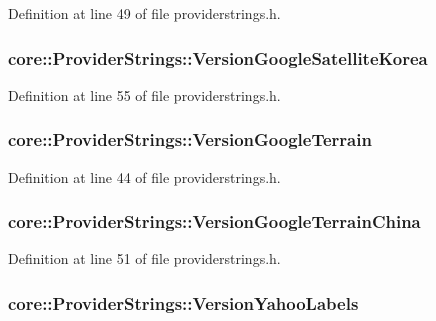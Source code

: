 \-Definition at line 49 of file providerstrings.\-h.

\hypertarget{group___o_p_map_widget_ga33344ab29672c4dcedd40642df473969}{
\subsubsection[{\-Version\-Google\-Satellite\-Korea}]{ {\bf core\-::\-Provider\-Strings\-::\-Version\-Google\-Satellite\-Korea}}}\label{group___o_p_map_widget_ga33344ab29672c4dcedd40642df473969}


\-Definition at line 55 of file providerstrings.\-h.

\hypertarget{group___o_p_map_widget_gacab9db5e4f5aff7ca4ea6bc63e1ca876}{
\subsubsection[{\-Version\-Google\-Terrain}]{ {\bf core\-::\-Provider\-Strings\-::\-Version\-Google\-Terrain}}}\label{group___o_p_map_widget_gacab9db5e4f5aff7ca4ea6bc63e1ca876}


\-Definition at line 44 of file providerstrings.\-h.

\hypertarget{group___o_p_map_widget_gad75c975b2a7aeefd01f65c78e701394b}{
\subsubsection[{\-Version\-Google\-Terrain\-China}]{ {\bf core\-::\-Provider\-Strings\-::\-Version\-Google\-Terrain\-China}}}\label{group___o_p_map_widget_gad75c975b2a7aeefd01f65c78e701394b}


\-Definition at line 51 of file providerstrings.\-h.

\hypertarget{group___o_p_map_widget_gae16013eddeb9d3b70af56f0e03eeab19}{
\subsubsection[{\-Version\-Yahoo\-Labels}]{ {\bf core\-::\-Provider\-Strings\-::\-Version\-Yahoo\-Labels}}}\label{group___o_p_map_widget_gae16013eddeb9d3b70af56f0e03eeab19}


